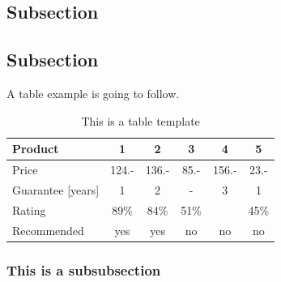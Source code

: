 \subsection{Subsection}

\subsection{Subsection}

A table example is going to follow.

\begin{table}[H]
\centering
\caption{This is a table template}
\begin{tabular}{|l|c|c|c|c|c|}
\hline
Product & 1 & 2 & 3 & 4 & 5\\
\hline
Price & 124.- & 136.- & 85.- & 156.- & 23.-\\
Guarantee [years] & 1 & 2 & - & 3 & 1\\
Rating & 89\% & 84\% & 51\% & & 45\%\\
\hline
\hline
Recommended & yes & yes & no & no & no\\
\hline
\end{tabular}
\label{tab:template2}
\end{table}
\subsubsection{This is a subsubsection}


